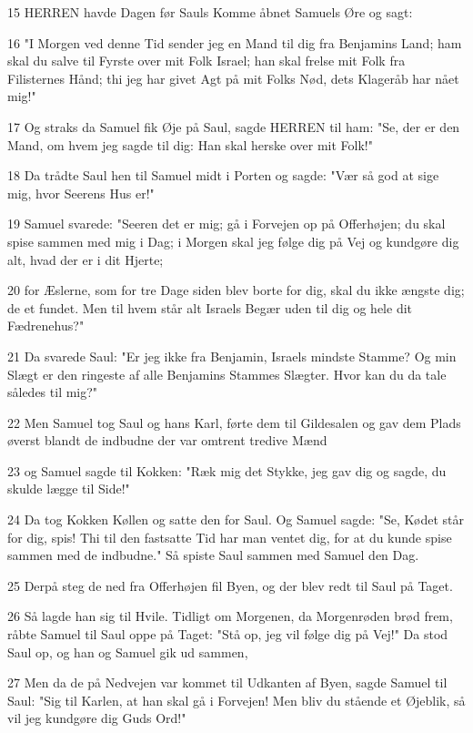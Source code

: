 \par 15 HERREN havde Dagen før Sauls Komme åbnet Samuels Øre og sagt:
\par 16 "I Morgen ved denne Tid sender jeg en Mand til dig fra Benjamins Land; ham skal du salve til Fyrste over mit Folk Israel; han skal frelse mit Folk fra Filisternes Hånd; thi jeg har givet Agt på mit Folks Nød, dets Klageråb har nået mig!"
\par 17 Og straks da Samuel fik Øje på Saul, sagde HERREN til ham: "Se, der er den Mand, om hvem jeg sagde til dig: Han skal herske over mit Folk!"
\par 18 Da trådte Saul hen til Samuel midt i Porten og sagde: "Vær så god at sige mig, hvor Seerens Hus er!"
\par 19 Samuel svarede: "Seeren det er mig; gå i Forvejen op på Offerhøjen; du skal spise sammen med mig i Dag; i Morgen skal jeg følge dig på Vej og kundgøre dig alt, hvad der er i dit Hjerte;
\par 20 for Æslerne, som for tre Dage siden blev borte for dig, skal du ikke ængste dig; de et fundet. Men til hvem står alt Israels Begær uden til dig og hele dit Fædrenehus?"
\par 21 Da svarede Saul: "Er jeg ikke fra Benjamin, Israels mindste Stamme? Og min Slægt er den ringeste af alle Benjamins Stammes Slægter. Hvor kan du da tale således til mig?"
\par 22 Men Samuel tog Saul og hans Karl, førte dem til Gildesalen og gav dem Plads øverst blandt de indbudne der var omtrent tredive Mænd
\par 23 og Samuel sagde til Kokken: "Ræk mig det Stykke, jeg gav dig og sagde, du skulde lægge til Side!"
\par 24 Da tog Kokken Køllen og satte den for Saul. Og Samuel sagde: "Se, Kødet står for dig, spis! Thi til den fastsatte Tid har man ventet dig, for at du kunde spise sammen med de indbudne." Så spiste Saul sammen med Samuel den Dag.
\par 25 Derpå steg de ned fra Offerhøjen fil Byen, og der blev redt til Saul på Taget.
\par 26 Så lagde han sig til Hvile. Tidligt om Morgenen, da Morgenrøden brød frem, råbte Samuel til Saul oppe på Taget: "Stå op, jeg vil følge dig på Vej!" Da stod Saul op, og han og Samuel gik ud sammen,
\par 27 Men da de på Nedvejen var kommet til Udkanten af Byen, sagde Samuel til Saul: "Sig til Karlen, at han skal gå i Forvejen! Men bliv du stående et Øjeblik, så vil jeg kundgøre dig Guds Ord!"

